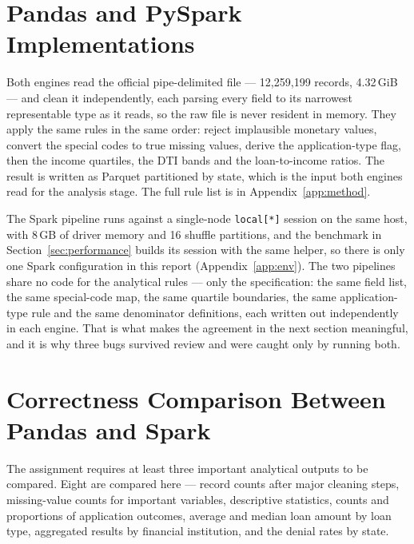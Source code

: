\documentclass[sigconf,balance=false]{acmart}
\begin{document}
\section{Pandas and PySpark Implementations}\label{sec:pandas}

Both engines read the official pipe-delimited file --- 12{,}259{,}199
records, 4.32\,GiB --- and clean it independently, each parsing every field
to its narrowest representable type as it reads, so the raw file is never
resident in memory. They apply the same rules in the same order: reject
implausible monetary values, convert the special codes to true missing
values, derive the application-type flag, then the income quartiles, the
DTI bands and the loan-to-income ratios. The result is written as Parquet
partitioned by state, which is the input both engines read for the analysis
stage. The full rule list is in Appendix~\ref{app:method}.

The Spark pipeline runs against a single-node \texttt{local[*]} session on
the same host, with 8\,GB of driver memory and 16 shuffle partitions, and
the benchmark in Section~\ref{sec:performance} builds its session with the
same helper, so there is only one Spark configuration in this report
(Appendix~\ref{app:env}). The two pipelines share no code for the
analytical rules --- only the specification: the same field list, the same
special-code map, the same quartile boundaries, the same application-type
rule and the same denominator definitions, each written out independently in
each engine. That is what makes the agreement in the next section
meaningful, and it is why three bugs survived review and were caught only
by running both.

\section{Correctness Comparison Between Pandas and Spark}\label{sec:correctness}

The assignment requires at least three important analytical outputs to be
compared. Eight are compared here --- record counts after major cleaning
steps, missing-value counts for important variables, descriptive statistics,
counts and proportions of application outcomes, average and median loan
amount by loan type, aggregated results by financial institution, and the
denial rates by state.
\end{document}
